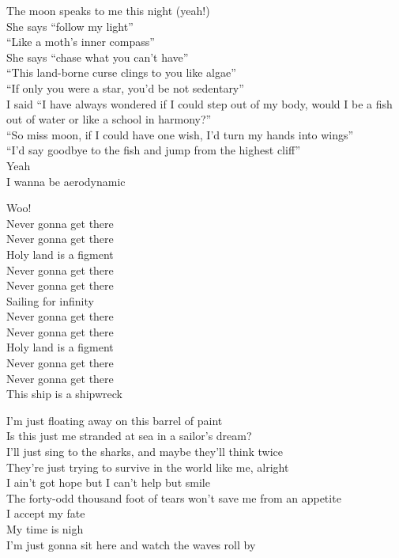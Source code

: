 
The moon speaks to me this night (yeah!) \\
She says ``follow my light'' \\
``Like a moth's inner compass'' \\
She says ``chase what you can't have'' \\
``This land-borne curse clings to you like algae'' \\
``If only you were a star, you'd be not sedentary'' \\
I said ``I have always wondered if I could step out of my body, would I be a fish out of water or like a school in harmony?'' \\
``So miss moon, if I could have one wish, I'd turn my hands into wings'' \\
``I'd say goodbye to the fish and jump from the highest cliff'' \\

Yeah \\
I wanna be aerodynamic \\


Woo! \\
Never gonna get there \\
Never gonna get there \\
Holy land is a figment \\
Never gonna get there \\
Never gonna get there \\
Sailing for infinity \\
Never gonna get there \\
Never gonna get there \\
Holy land is a figment \\
Never gonna get there \\
Never gonna get there \\
This ship is a shipwreck \\


I'm just floating away on this barrel of paint \\
Is this just me stranded at sea in a sailor's dream? \\
I'll just sing to the sharks, and maybe they'll think twice \\
They're just trying to survive in the world like me, alright \\
I ain't got hope but I can't help but smile \\
The forty-odd thousand foot of tears won't save me from an appetite \\
I accept my fate \\
My time is nigh \\
I'm just gonna sit here and watch the waves roll by \\


